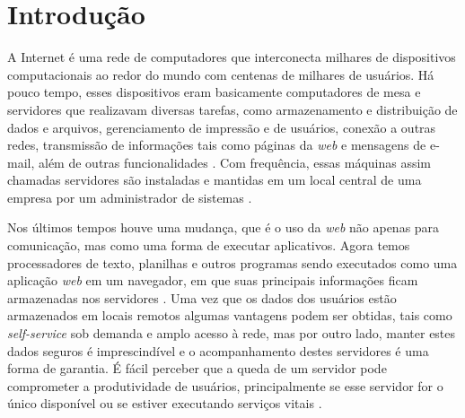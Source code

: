 
\chapter{Introdução} \label{Cap:Introducao}

A Internet é uma rede de computadores que interconecta milhares de dispositivos computacionais ao redor do mundo com centenas de milhares de usuários. Há pouco tempo, esses dispositivos eram basicamente computadores de mesa e servidores que realizavam diversas tarefas, como armazenamento e distribuição de dados e arquivos, gerenciamento de impressão e de usuários, conexão a outras redes, transmissão de informações tais como páginas da \textit{web} e mensagens de e-mail, além de outras funcionalidades \cite{Kurose:2010}. Com frequência, essas máquinas assim chamadas servidores são instaladas e mantidas em um local central de uma empresa por um administrador de sistemas \cite{Tanenbaum:2003}. 

Nos últimos tempos houve uma mudança, que é o uso da \textit{web} não apenas para comunicação, mas como uma forma de executar aplicativos.  Agora temos processadores de texto, planilhas e outros programas sendo executados como uma aplicação \textit{web} em um navegador, em que suas principais informações ficam armazenadas nos servidores \cite{Marimoto:2011}. Uma vez que os dados dos usuários estão armazenados em locais remotos algumas vantagens podem ser obtidas, tais como \textit{self-service} sob demanda e amplo acesso à rede, \cite{Sampaio:2003}  mas por outro lado, manter estes dados seguros é imprescindível e o acompanhamento destes servidores é uma forma de garantia. É fácil perceber que a queda de um servidor pode comprometer a produtividade de usuários, principalmente se esse servidor for o único disponível ou se estiver executando serviços vitais \cite{Weber:2002}.


